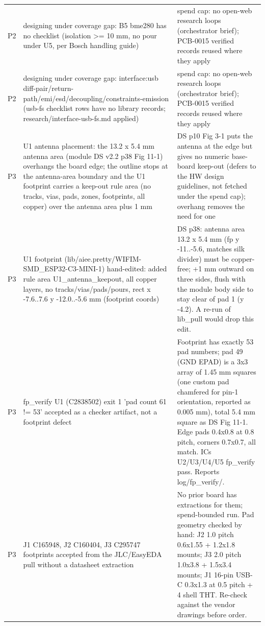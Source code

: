 \documentclass[11pt]{article}
\begin{document}
{\begin{longtable}{lp{5.2cm}p{7.2cm}}
P2 & designing under coverage gap: B5 bme280 has no checklist (isolation \textgreater{}= 10 mm, no pour under U5, per Bosch handling guide) & spend cap: no open-web research loops (orchestrator brief); PCB-0015 verified records reused where they apply \\
P2 & designing under coverage gap: interface:usb diff-pair/return-path/emi/esd/decoupling/constraints-emission (usb-fs checklist rows have no library records; research/interface-usb-fs.md applied) & spend cap: no open-web research loops (orchestrator brief); PCB-0015 verified records reused where they apply \\
P3 & U1 antenna placement: the 13.2 x 5.4 mm antenna area (module DS v2.2 p38 Fig 11-1) overhangs the board edge; the outline stops at the antenna-area boundary and the U1 footprint carries a keep-out rule area (no tracks, vias, pads, zones, footprints, all copper) over the antenna area plus 1 mm & DS p10 Fig 3-1 puts the antenna at the edge but gives no numeric base-board keep-out (defers to the HW design guidelines, not fetched under the spend cap); overhang removes the need for one \\
P3 & U1 footprint (lib/aiee.pretty/WIFIM-SMD\_ESP32-C3-MINI-1) hand-edited: added rule area U1\_antenna\_keepout, all copper layers, no tracks/vias/pads/pours, rect x -7.6..7.6 y -12.0..-5.6 mm (footprint coords) & DS p38: antenna area 13.2 x 5.4 mm (fp y -11..-5.6, matches silk divider) must be copper-free; +1 mm outward on three sides, flush with the module body side to stay clear of pad 1 (y -4.2). A re-run of lib\_pull would drop this edit. \\
P3 & fp\_verify U1 (C2838502) exit 1 'pad count 61 != 53' accepted as a checker artifact, not a footprint defect & Footprint has exactly 53 pad numbers; pad 49 (GND EPAD) is a 3x3 array of 1.45 mm squares (one custom pad chamfered for pin-1 orientation, reported as 0.005 mm), total 5.4 mm square as DS Fig 11-1. Edge pads 0.4x0.8 at 0.8 pitch, corners 0.7x0.7, all match. ICs U2/U3/U4/U5 fp\_verify pass. Reports log/fp\_verify/. \\
P3 & J1 C165948, J2 C160404, J3 C295747 footprints accepted from the JLC/EasyEDA pull without a datasheet extraction & No prior board has extractions for them; spend-bounded run. Pad geometry checked by hand: J2 1.0 pitch 0.6x1.55 + 1.2x1.8 mounts; J3 2.0 pitch 1.0x3.8 + 1.5x3.4 mounts; J1 16-pin USB-C 0.3x1.3 at 0.5 pitch + 4 shell THT. Re-check against the vendor drawings before order. \\
\hline
\end{longtable}
}
\end{document}
